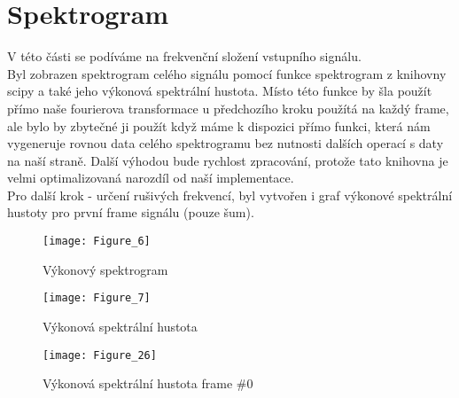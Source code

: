 \section{Spektrogram}

V této části se podíváme na frekvenční složení vstupního signálu. \\
Byl zobrazen spektrogram celého signálu pomocí funkce spektrogram z knihovny scipy a také jeho výkonová spektrální hustota. Místo této funkce by šla použít přímo naše fourierova transformace u předchozího kroku použítá na každý frame, ale bylo by zbytečné ji použít když máme k dispozici přímo funkci, která nám vygeneruje rovnou data celého spektrogramu bez nutnosti dalších operací s daty na naší straně. Další výhodou bude rychlost zpracování, protože tato knihovna je velmi optimalizovaná narozdíl od naší implementace. \\
Pro další krok - určení rušivých frekvencí, byl vytvořen i graf výkonové spektrální hustoty pro první frame signálu (pouze šum).

\begin{figure}[H] 
	\centering
	\texttt{[image: Figure\_6]}
	\caption{Výkonový spektrogram}
\end{figure}

\begin{figure}[H] 
	\centering
	\texttt{[image: Figure\_7]}
	\caption{Výkonová spektrální hustota}
\end{figure}

\begin{figure}[H] 
	\centering
	\texttt{[image: Figure\_26]}
	\caption{Výkonová spektrální hustota frame \#0}
\end{figure}